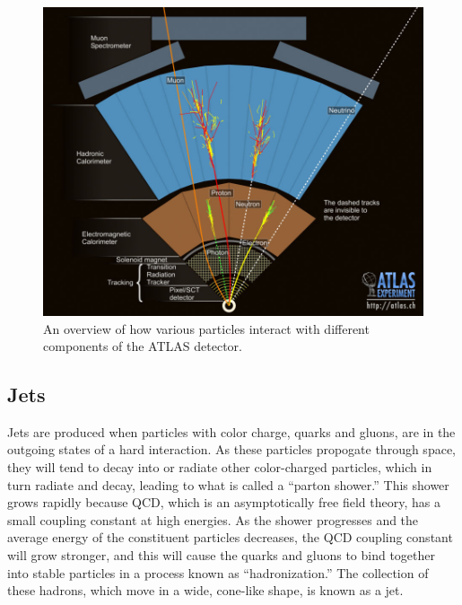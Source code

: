 \begin{figure}
  \begin{center}
    \includegraphics[width=125mm]{figures/atlas/ParticleInteractionOverview.jpg}
  \end{center}
  \caption{An overview of how various particles interact with different components of the ATLAS detector.}
  \label{img:ParticleInteractionOverview}
\end{figure}


\subsection{Jets}
Jets are produced when particles with color charge, quarks and gluons, are in the outgoing states of a hard interaction.
As these particles propogate through space, they will tend to decay into or radiate other color-charged particles, which in turn radiate and decay, leading to what is called a ``parton shower.''
This shower grows rapidly because QCD, which is an asymptotically free field theory, has a small coupling constant at high energies.  
As the shower progresses and the average energy of the constituent particles decreases, the QCD coupling constant will grow stronger, and this will cause the quarks and gluons to bind together into stable particles in a process known as ``hadronization.''
The collection of these hadrons, which move in a wide, cone-like shape, is known as a jet.

